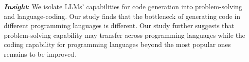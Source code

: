 {\footnotesize {}} \textit{\textbf{Insight}}: We isolate LLMs' capabilities for code generation into problem-solving and language-coding. Our study finds that the bottleneck of generating code in different programming languages is different. Our study further suggests that problem-solving capability may transfer across programming languages while the coding capability for programming languages beyond the most popular ones remains to be improved.



